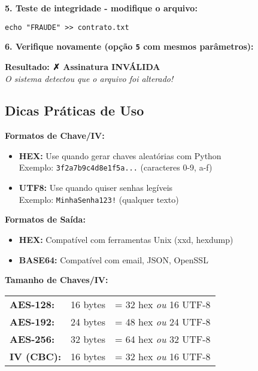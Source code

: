 \documentclass[12pt,a4paper]{article}
\begin{document}
\textbf{5. Teste de integridade - modifique o arquivo:}

\begin{lstlisting}[style=bashstyle]
echo "FRAUDE" >> contrato.txt
\end{lstlisting}

\textbf{6. Verifique novamente (opção \texttt{5} com mesmos parâmetros):}

\begin{tcolorbox}[colback=dangerred!10,colframe=dangerred]
\footnotesize
\textcolor{dangerred}{\textbf{Resultado: ✗ Assinatura INVÁLIDA}}\\
\textit{O sistema detectou que o arquivo foi alterado!}
\end{tcolorbox}

\subsection{Dicas Práticas de Uso}

\begin{infobox}
\textbf{Formatos de Chave/IV:}
\begin{itemize}
    \item \textbf{HEX:} Use quando gerar chaves aleatórias com Python\\
    \quad Exemplo: \texttt{3f2a7b9c4d8e1f5a...} (caracteres 0-9, a-f)
    \item \textbf{UTF8:} Use quando quiser senhas legíveis\\
    \quad Exemplo: \texttt{MinhaSenha123!} (qualquer texto)
\end{itemize}
\end{infobox}

\begin{infobox}
\textbf{Formatos de Saída:}
\begin{itemize}
    \item \textbf{HEX:} Compatível com ferramentas Unix (xxd, hexdump)
    \item \textbf{BASE64:} Compatível com email, JSON, OpenSSL
\end{itemize}
\end{infobox}

\begin{successbox}
\textbf{Tamanho de Chaves/IV:}\\[0.5em]
\begin{tabular}{lll}
\textbf{AES-128:} & 16 bytes & = 32 hex \textit{ou} 16 UTF-8 \\
\textbf{AES-192:} & 24 bytes & = 48 hex \textit{ou} 24 UTF-8 \\
\textbf{AES-256:} & 32 bytes & = 64 hex \textit{ou} 32 UTF-8 \\
\textbf{IV (CBC):} & 16 bytes & = 32 hex \textit{ou} 16 UTF-8 \\
\end{tabular}
\end{successbox}
\end{document}
